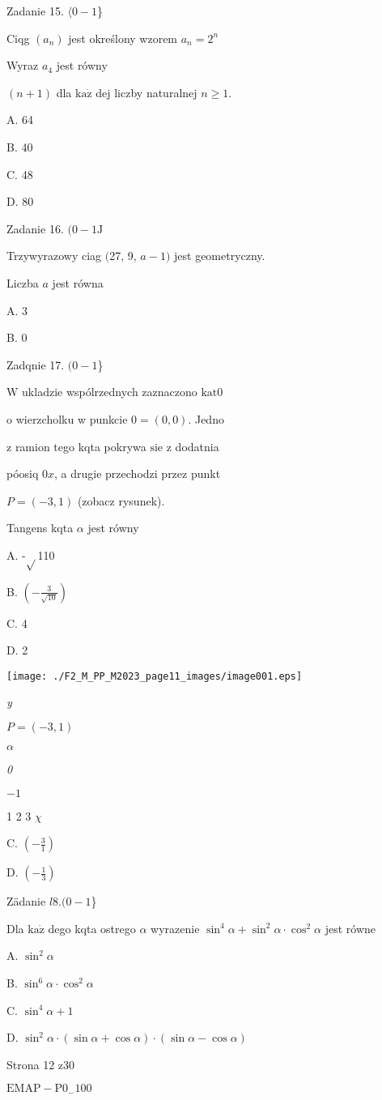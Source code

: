 \documentclass[a4paper,12pt]{article}
\begin{document}
Zadanie 15. $\langle 0-1$\}

Ciqg $(a_{n})$ jest określony wzorem $a_{n}=2^{n}$

Wyraz $a_{4}$ jest równy

$(n+1)$ dla $\mathrm{k}\mathrm{a}\dot{\mathrm{z}}$ dej liczby naturalnej $n\geq 1.$

A. 64

B. 40

C. 48

D. 80

Zadanie 16. $(0-1\mathrm{J}$

Trzywyrazowy ciag $($27, 9, $a-1)$ jest geometryczny.

Liczba $a$ jest równa

A. 3

B. 0

Zadqnie 17. $(0-1$\}

$\mathrm{W}$ ukladzie wspólrzednych zaznaczono $\mathrm{k}\mathrm{a}\mathrm{t} 0$

o wierzcholku w punkcie $0=(0,0)$. Jedno

z ramion tego kqta pokrywa $\mathrm{s}\mathrm{i}\mathrm{e}$ z dodatnia

póosiq $0x$, a drugie przechodzi przez punkt

$P=(-3,1)$ (zobacz rysunek).

Tangens kqta $\alpha$ jest równy

A. -$\sqrt{}$110

B. $(-\displaystyle \frac{3}{\sqrt{10}})$

C. 4

D. 2
\begin{center}
\texttt{[image: ./F2\_M\_PP\_M2023\_page11\_images/image001.eps]}
\end{center}
{\it y}

$P=(-3,1)$

$\alpha$

{\it 0}

$-1$

1 2 3  $\chi$

C. $(-\displaystyle \frac{3}{1})$

D. $(-\displaystyle \frac{1}{3})$

Zädanie $l8. (0-1$\}

Dla $\mathrm{k}\mathrm{a}\dot{\mathrm{z}}$ dego kqta ostrego $\alpha$ wyrazenie $\sin^{4}\alpha+\sin^{2}\alpha\cdot\cos^{2}\alpha$ jest równe

A. $\sin^{2}\alpha$

B. $\sin^{6}\alpha\cdot\cos^{2}\alpha$

C. $\sin^{4}\alpha+1$

D. $\sin^{2}\alpha\cdot(\sin\alpha+\cos\alpha)\cdot(\sin\alpha-\cos\alpha)$

Strona 12 z30

$\mathrm{E}\mathrm{M}\mathrm{A}\mathrm{P}-\mathrm{P}0_{-}100$
\end{document}
